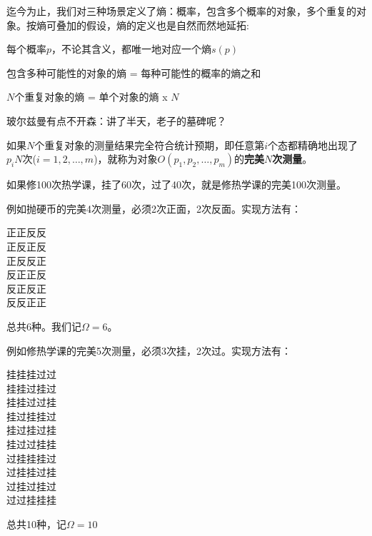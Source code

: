 \documentclass[CJK]{beamer}
\begin{document}
\begin{frame}
\bch
迄今为止，我们对三种场景定义了熵：概率，包含多个概率的对象，多个重复的对象。按熵可叠加的假设，熵的定义也是自然而然地延拓:
\bitem
\item{每个概率$p$，不论其含义，都唯一地对应一个熵$s(p)$}
\item{包含多种可能性的对象的熵 = 每种可能性的概率的熵之和}
\item{$N$个重复对象的熵 = 单个对象的熵 x $N$}
\eitem

\skiplines

\emini
{}
玻尔兹曼有点不开森：讲了半天，老子的墓碑呢？
\emini

\ech
\end{frame}


\begin{frame}
\bch
如果$N$个重复对象的测量结果完全符合统计预期，即任意第$i$个态都精确地出现了$p_i N$次($i=1,2,\ldots,m$)，就称为对象$O(p_1, p_2, \ldots, p_m)$的{\bf \blue 完美$N$次测量}。

\skipline


\bex

如果修100次热学课，挂了60次，过了40次，就是修热学课的完美100次测量。

\eex


\ech
\end{frame}


\begin{frame}
\bch
例如抛硬币的完美4次测量，必须2次正面，2次反面。实现方法有：

\begin{center}
正正反反 \\
正反正反 \\
正反反正 \\
反正正反 \\
反正反正 \\
反反正正
\end{center}

总共6种。我们记$\Omega= 6$。

\ech
\end{frame}


\begin{frame}
\bch
例如修热学课的完美5次测量，必须3次挂，2次过。实现方法有：
 
\begin{center}
{\small
挂挂挂过过 \\
挂挂过挂过 \\
挂挂过过挂 \\
挂过挂挂过 \\
挂过挂过挂 \\
挂过过挂挂 \\
过挂挂挂过 \\
过挂挂过挂 \\
过挂过挂过 \\
过过挂挂挂
}
\end{center}
 
总共10种，记$\Omega = 10$

\ech
\end{frame}
\end{document}
